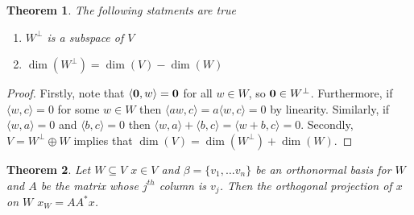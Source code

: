 \documentclass[oneside, 12pt]{book}
\newtheorem{thm}{Theorem}[section]
\theoremstyle{definition}
\begin{document}
\begin{thm}
The following statments are true
\begin{enumerate}
  \item $W^{\perp}$ is a subspace of $V$
  \item $\dim(W^{\perp})=\dim(V)-\dim(W)$
\end{enumerate}
\end{thm}
\begin{proof}
  Firstly, note that $ \langle \bold{0}, w\rangle=\bold{0}$ for all $w \in W$, so $\bold{0} \in W^{\perp}$. Furthermore, if $\langle w, c\rangle=0$ for some $w \in W$ then
  $\langle aw, c \rangle = a \langle w, c \rangle =0 $ by linearity. Similarly, if $\langle w, a \rangle=0  $ and $\langle b, c \rangle=0  $ then $\langle w, a \rangle+ \langle b, c \rangle= \langle w+b, c \rangle =0$. Secondly, $V= W^{\perp} \oplus W$ implies that $\dim(V)=\dim(W^{\perp})+\dim(W)$.
\end{proof}

\begin{thm}
Let $W \subseteq V$ $x \in V$ and $\beta=\{v_{1}, \dots v_{n}\}$ be an orthonormal basis for $W$ and $A$ be the matrix whose $j^{th}$ column is $v_{j}$. Then the orthogonal projection of $x$ on $W$ $x_{W}=AA^{*}x$.
\end{thm}
\end{document}
